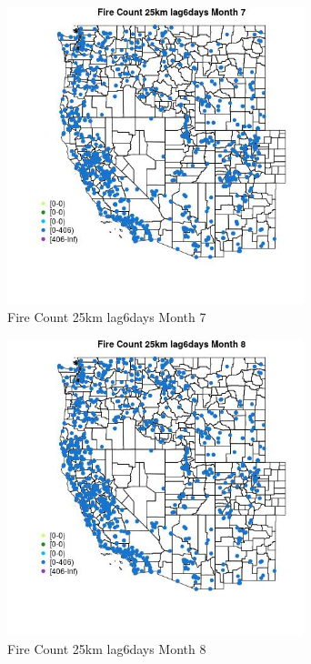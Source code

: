 \begin{figure} 
\centering  
\includegraphics[width=0.77\textwidth]{Code_Outputs/Report_ML_input_PM25_Step4_part_f_de_duplicated_aves_prioritize_24hr_obswNAs_MapObsMo7Fire_Count_25km_lag6days.jpg} 
\caption{\label{fig:Report_ML_input_PM25_Step4_part_f_de_duplicated_aves_prioritize_24hr_obswNAsMapObsMo7Fire_Count_25km_lag6days}Fire Count 25km lag6days Month 7} 
\end{figure} 
 

\begin{figure} 
\centering  
\includegraphics[width=0.77\textwidth]{Code_Outputs/Report_ML_input_PM25_Step4_part_f_de_duplicated_aves_prioritize_24hr_obswNAs_MapObsMo8Fire_Count_25km_lag6days.jpg} 
\caption{\label{fig:Report_ML_input_PM25_Step4_part_f_de_duplicated_aves_prioritize_24hr_obswNAsMapObsMo8Fire_Count_25km_lag6days}Fire Count 25km lag6days Month 8} 
\end{figure} 
 

